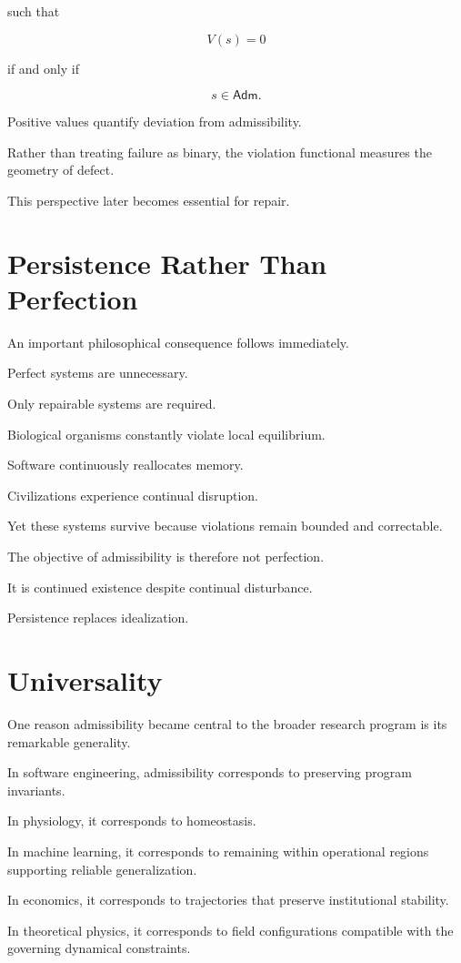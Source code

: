 \documentclass[11pt,oneside]{book}
\numberwithin{equation}{chapter}
\theoremstyle{definition}
\theoremstyle{plain}
\newcommand{\Adm}{\mathsf{Adm}}
\begin{document}
such that

\[
V(s)=0
\]

if and only if

\[
s
\in
\Adm.
\]

Positive values quantify deviation from admissibility.

Rather than treating failure as binary, the violation functional measures
the geometry of defect.

This perspective later becomes essential for repair.

\section{Persistence Rather Than Perfection}

An important philosophical consequence follows immediately.

Perfect systems are unnecessary.

Only repairable systems are required.

Biological organisms constantly violate local equilibrium.

Software continuously reallocates memory.

Civilizations experience continual disruption.

Yet these systems survive because violations remain bounded and correctable.

The objective of admissibility is therefore not perfection.

It is continued existence despite continual disturbance.

Persistence replaces idealization.

\section{Universality}

One reason admissibility became central to the broader research program is
its remarkable generality.

In software engineering, admissibility corresponds to preserving program
invariants.

In physiology, it corresponds to homeostasis.

In machine learning, it corresponds to remaining within operational regions
supporting reliable generalization.

In economics, it corresponds to trajectories that preserve institutional
stability.

In theoretical physics, it corresponds to field configurations compatible
with the governing dynamical constraints.
\end{document}
